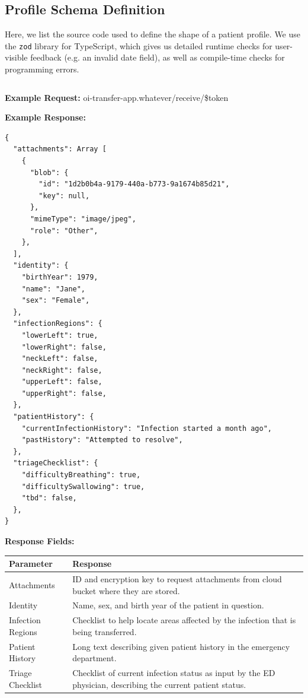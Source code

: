 \documentclass[11pt,letterpaper]{article}
\begin{document}
\newpage
\vspace*{2in}
\newpage
\begin{appendices}

\section{Profile Schema Definition}
\label{appendix:profile}

Here, we list the source code used to define the shape of a patient profile. We use the \verb|zod| library for TypeScript, which gives us detailed runtime checks for user-visible feedback (e.g. an invalid date field), as well as compile-time checks for programming errors.

\inputminted{typescript}{profile.ts}

\textbf{Example Request: } oi-transfer-app.whatever/receive/\$token 


\textbf{Example Response: }
\begin{verbatim}
{
  "attachments": Array [
    {
      "blob": {
        "id": "1d2b0b4a-9179-440a-b773-9a1674b85d21",
        "key": null,
      },
      "mimeType": "image/jpeg",
      "role": "Other",
    },
  ],
  "identity": {
    "birthYear": 1979,
    "name": "Jane",
    "sex": "Female",
  },
  "infectionRegions": {
    "lowerLeft": true,
    "lowerRight": false,
    "neckLeft": false,
    "neckRight": false,
    "upperLeft": false,
    "upperRight": false,
  },
  "patientHistory": {
    "currentInfectionHistory": "Infection started a month ago",
    "pastHistory": "Attempted to resolve",
  },
  "triageChecklist": {
    "difficultyBreathing": true,
    "difficultySwallowing": true,
    "tbd": false,
  },
}
\end{verbatim}


\textbf{Response Fields:}

\begin{center}
\begin{tabular}{|p{3cm}|p{10cm}|}
     \hline
     \textbf{Parameter} & \textbf{Response} \\
     \hline
     \hline
     Attachments & ID and encryption key to request attachments from cloud bucket where they are stored.\\
     \hline
     Identity & Name, sex, and birth year of the patient in question.\\
     \hline
     Infection Regions & Checklist to help locate areas affected by the infection that is being transferred.\\
     \hline
     Patient History & Long text describing given patient history in the emergency department.\\
     \hline
     Triage Checklist & Checklist of current infection status as input by the ED physician, describing the current patient status.\\
     \hline
\end{tabular}
\end{center}

\end{appendices}
\end{document}
